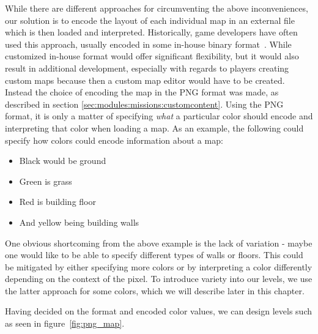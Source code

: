 While there are different approaches for circumventing the above inconveniences, our solution is to encode the layout of each individual map in an external file which is then loaded and interpreted.
Historically, game developers have often used this approach, usually encoded in some in-house binary format~\cite{quake-bsp-format}.
While customized in-house format would offer significant flexibility, but it would also result in additional development, especially with regards to players creating custom maps because then a custom map editor would have to be created.
Instead the choice of encoding the map in the PNG format was made, as described in section \ref{sec:modules:missions:customcontent}.
Using the PNG format, it is only a matter of specifying \textit{what} a particular color should encode and interpreting that color when loading a map.
As an example, the following could specify how colors could encode information about a map:
\begin{itemize}
    \item Black would be ground
    \item Green is grass
    \item Red is building floor
    \item And yellow being building walls
\end{itemize}
One obvious shortcoming from the above example is the lack of variation - maybe one would like to be able to specify different types of walls or floors. 
This could be mitigated by either specifying more colors or by interpreting a color differently depending on the context of the pixel.
To introduce variety into our levels, we use the latter approach for some colors, which we will describe later in this chapter.

Having decided on the format and encoded color values, we can design levels such as seen in figure~\ref{fig:png_map}.


